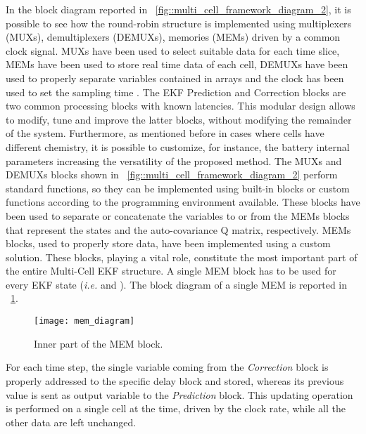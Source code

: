 \documentclass[journal]{IEEEtran}
\begin{document}
In the block diagram reported in \figurename~\ref{fig::multi_cell_framework_diagram_2}, it is possible to see how the round-robin structure is implemented using multiplexers (MUXs), demultiplexers (DEMUXs), memories (MEMs) driven by a common clock signal. 
MUXs have been used to select suitable data for each time slice, MEMs have been used to store real time data of each cell, DEMUXs have been used to properly separate variables contained in arrays and the clock has been used to set the sampling time .
The EKF Prediction and Correction blocks are two common processing blocks with known latencies. This modular design allows to modify, tune and improve the latter blocks, without modifying the remainder of the system.  
Furthermore, as mentioned before in cases where cells have different chemistry, it is possible to customize, for instance, the battery internal parameters increasing the versatility of the proposed method.
The MUXs and DEMUXs blocks shown in \figurename~\ref{fig::multi_cell_framework_diagram_2} perform standard functions, so they can be implemented using built-in blocks or custom functions according to the programming environment available. 
These blocks have been used to separate or concatenate the variables to or from the MEMs blocks that represent the states and the auto-covariance Q matrix, respectively.
MEMs blocks, used to properly store data, have been implemented using a custom solution.
These blocks, playing a vital role, constitute the most important part of the entire Multi-Cell EKF structure.
A single MEM block has to be used for every EKF state (\textit{i.e.}  and ).
The block diagram of a single MEM is reported in \figurename~\ref{fig::mem_diagram}.
\begin{figure}[!htbp]
	\centering
		\texttt{[image: mem\_diagram]}
	\caption{Inner part of the MEM block.}
	\label{fig::mem_diagram}
\end{figure}
For each time step, the single variable coming from the \textit{Correction} block is properly addressed to the specific delay block and stored, whereas its previous value is sent as output variable to the \textit{Prediction} block.
This updating operation is performed on a single cell at the time, driven by the clock rate, while all the other data are left unchanged.
\end{document}
